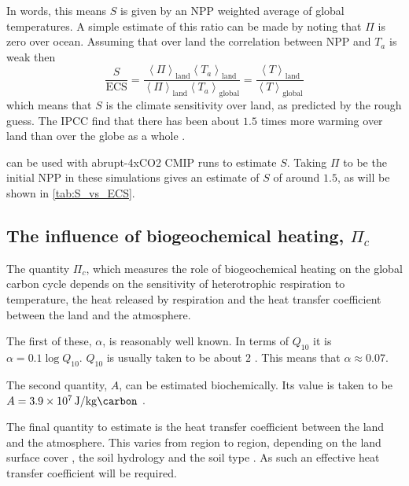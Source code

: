 In words, this means $S$ is given by an NPP weighted average of global temperatures. A simple estimate of this ratio can be made by noting that $\Pi$ is zero over ocean.
Assuming that over land the correlation between NPP and $T_a$ is weak then
\begin{equation}
  \label{eq:S_vs_ECS_land_ocean}
  \frac{S}{\mathrm{ECS}}
  = \frac{\left\langle \Pi\right\rangle_{\mathrm{land}} \left\langle T_a \right\rangle_{\mathrm{land}}}{\left \langle \Pi \right\rangle_{\mathrm{land}} \left \langle T_a \right \rangle_{\mathrm{global}}}
  = \frac{\left\langle T\right\rangle_{\mathrm{land}}}{\left\langle T \right\rangle_{\mathrm{global}}}
\end{equation}
which means that $S$ is the climate sensitivity over land, as predicted by the rough guess. The IPCC find that there has been about $1.5$ times more warming over land than over the globe
as a whole \parencite{AR6}.

 can be used with abrupt-4xCO2 CMIP runs \parencite{Eyring2016} to estimate $S$. Taking $\Pi$ to be the initial NPP in these simulations gives an estimate of $S$ of around $1.5$,
as will be shown in \cref{tab:S_vs_ECS}.

\subsection{The influence of biogeochemical heating, $\Pi_c$}
The quantity $\Pi_c$, which measures the role of biogeochemical heating on the global carbon cycle depends on the sensitivity of heterotrophic respiration to
temperature, the heat released by respiration and the heat transfer coefficient between the land and the atmosphere.

The first of these, $\alpha$, is reasonably well known. In terms of $Q_{10}$ it is $\alpha = 0.1 \log Q_{10}$. $Q_{10}$ is usually taken to be about $2$
\parencite{Jones2001,Clark2011}. This means that $\alpha \approx 0.07$.

The second quantity, $A$, can be estimated biochemically. Its value is taken to be $A = \SI{3.9E7}{\joule\per\kilo\gram\carbon}$ \parencite{Luke2011}.

The final quantity to estimate is the heat transfer coefficient between the land and the atmosphere. This varies from region to region, depending on the land surface cover
\parencite{Beringer2001}, the soil hydrology \parencite{Dharssi2009} and the soil type \parencite{Best2011}. As such an effective heat transfer coefficient will be required.

